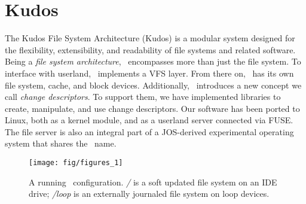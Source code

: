 \section {Kudos}
\label{sec:kudos}

The Kudos File System Architecture (Kudos) is a modular system designed for
the flexibility, extensibility, and readability of file systems and related
software. Being a \emph{file system architecture}, \Kudos\ encompasses more
than just the file system. To interface with userland, \Kudos\ implements a
VFS layer.
From there on, \Kudos\ has its own file system, cache, and block devices.
Additionally, \Kudos\ introduces a new concept we call
\emph{change descriptors}.
To support them, we have implemented libraries to create, manipulate, and use
change descriptors. Our software has been ported to Linux, both as a kernel
module, and as a userland server connected via FUSE. The file server is also
an integral part of a JOS-derived experimental operating system that shares
the \Kudos\ name.

\begin{figure}[tb]
  \centering
  \texttt{[image: fig/figures\_1]}
  \caption{A running \Kudos\ configuration. {\it/} is a soft updated
    file system on an IDE drive; {\it/loop} is an externally journaled
    file system on loop devices.}
  \label{fig:kfs-graph}
\end{figure}







